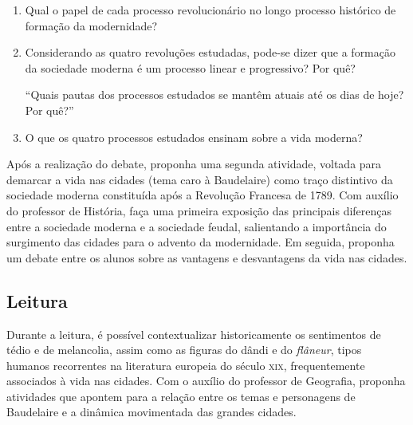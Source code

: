 \documentclass[12pt]{extarticle}
\begin{document}
\begin{enumerate}
\item Qual o papel de cada processo revolucionário no longo processo histórico de formação da modernidade?

\item Considerando as quatro revoluções estudadas, pode-se dizer que a formação da sociedade moderna é um processo linear e progressivo? Por quê?

``Quais pautas dos processos estudados se mantêm atuais até os dias de hoje? Por quê?''

\item O que os quatro processos estudados ensinam sobre a vida moderna?
\end{enumerate}


Após a realização do debate, proponha uma segunda atividade, voltada para demarcar a vida nas cidades (tema caro à Baudelaire) como traço distintivo da sociedade moderna constituída após a Revolução Francesa de 1789. Com auxílio do professor de História, faça uma primeira exposição das principais diferenças entre a sociedade moderna e a sociedade feudal, salientando a importância do surgimento das cidades para o advento da modernidade. Em seguida, proponha um debate entre os alunos sobre as vantagens e desvantagens da vida nas cidades.




\subsection{Leitura}

Durante a leitura, é possível contextualizar historicamente
os sentimentos de tédio e de melancolia, assim como as figuras do dândi
e do \textit{flâneur}, tipos humanos recorrentes na literatura europeia do
século \textsc{xix}, frequentemente associados à vida nas cidades. Com o auxílio do professor de Geografia, proponha atividades que apontem para a relação entre os temas e personagens de Baudelaire e a dinâmica movimentada das grandes cidades. 
\end{document}
